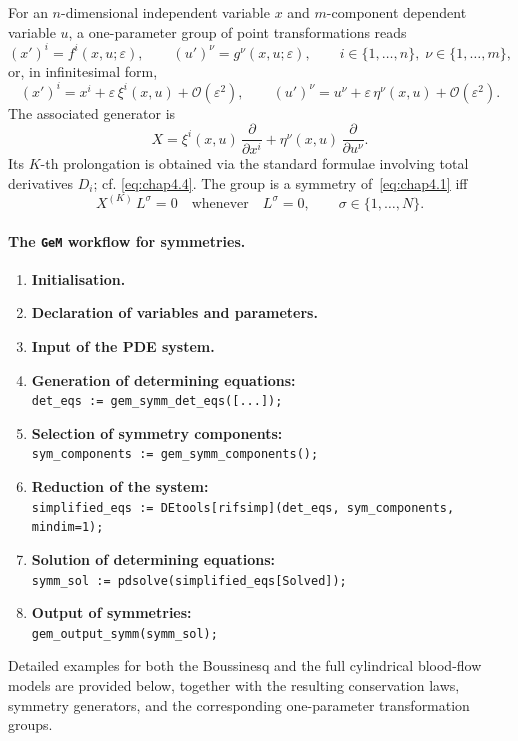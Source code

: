 \documentclass[alpha-refs, 12pt]{wiley-article}
\newcommand{\pd}[2]{\frac{\partial #1}{\partial #2}}
\begin{document}
For an $n$-dimensional independent variable $x$ and $m$-component dependent variable $u$, a one-parameter group of point transformations reads
\[
  (x')^{i}=f^{i}(x,u;\varepsilon), \qquad
  (u')^{\nu}=g^{\nu}(x,u;\varepsilon),
  \qquad
  i \in \{1,\dots,n\},\;
  \nu \in \{1,\dots,m\},
\]
or, in infinitesimal form,
\[
  (x')^{i}=x^{i}+\varepsilon\,\xi^{i}(x,u)+\mathcal{O}(\varepsilon^{2}),\qquad
  (u')^{\nu}=u^{\nu}+\varepsilon\,\eta^{\nu}(x,u)+\mathcal{O}(\varepsilon^{2}).
\]
The associated generator is
\[
  X=\xi^{i}(x,u)\,\pd{}{x^{i}}+\eta^{\nu}(x,u)\,\pd{}{u^{\nu}}.
\]
Its $K$-th prolongation is obtained via the standard formulae involving total derivatives $D_{i}$; cf. \eqref{eq:chap4.4}. The group is a symmetry of~\eqref{eq:chap4.1} iff
\[
  X^{(K)}\,L^{\sigma}=0
  \quad\text{whenever}\quad
  L^{\sigma}=0,
  \qquad \sigma \in \{1,\dots,N\}.
\]

\paragraph{The \texttt{GeM} workflow for symmetries.}
\begin{enumerate}[label=(\roman*)]
  \item \textbf{Initialisation.}
  \item \textbf{Declaration of variables and parameters.}
  \item \textbf{Input of the PDE system.}
  \item \textbf{Generation of determining equations:}\\
        \verb|det_eqs := gem_symm_det_eqs([...]);|
  \item \textbf{Selection of symmetry components:}\\
        \verb|sym_components := gem_symm_components();|
  \item \textbf{Reduction of the system:}\\
        \verb|simplified_eqs := DEtools[rifsimp](det_eqs, sym_components, mindim=1);|
  \item \textbf{Solution of determining equations:}\\
        \verb|symm_sol := pdsolve(simplified_eqs[Solved]);|
  \item \textbf{Output of symmetries:}\\
        \verb|gem_output_symm(symm_sol);|
\end{enumerate}

Detailed examples for both the Boussinesq and the full cylindrical blood-flow models are provided below, together with the resulting conservation laws, symmetry generators, and the corresponding one-parameter transformation groups.
\end{document}
